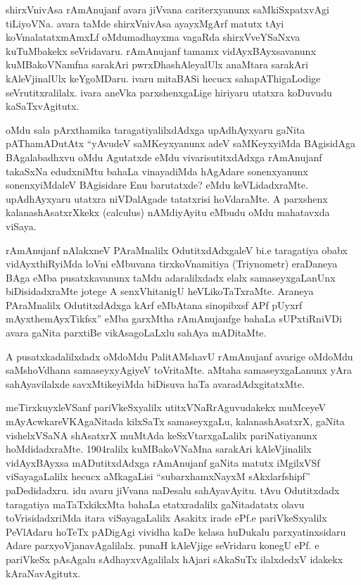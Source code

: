 shirxVnivAsa rAmAnujanf avara jiVvana cariterxyanunx saMkiSxpatxvAgi tiLiyoVNa. avara taMde shirxVnivAsa ayayxMgArf matutx tAyi koVmalatatxmAmxLf oMdu\break madhayxma vagaRda shirxVveYSaNxva kuTuMbakekx seVridavaru. rAmAnujanf tamamx vidAyxBAyxsavanunx kuMBa\-koVNamfna sarakAri pwrxDhashAleyalUlx anaMtara sarakAri kAleVjinalUlx keYgoMDaru. ivaru mitaBASi hecucx sahapAThigaLodige seVrutitxralilalx. ivara aneVka parxshenxgaLige hiriyaru utatxra koDuvudu kaSaTxvAgitutx.

oMdu sala pArxthamika taragatiyalilxdAdxga upAdhAyxyaru gaNita pATha\-mADutAtx ``yAvudeV saMKeyxyanunx adeV saMKeyxyiMda BAgisidAga BAgalabadhxvu oMdu Agutatxde eMdu vivarisutitxdAdxga rAmAnujanf takaSxNa edudxniMtu bahaLa vinayadiMda hAgA\-dare sonenxyanunx sonenxyiMdaleV BAgisidare Enu barutatxde? eMdu keVLidadxraMte. upAdhAyxyaru utatxra niVDalAgade tatatxrisi hoVdaraMte. A parxshenx kalanashAsatxrXkekx {\rm (calculus)} nAMdiyAyitu eMbudu oMdu mahatavxda viSaya. 

rAmAnujanf nAlakxneV PAraMnalilx OdutitxdAdxgaleV bi.e taragatiya obabx vidAyxthiR\-yiMda loVni eMbuvana tirxkoVnamitiya {\rm (Triynometr)} eraDaneya BAga eMba pusatxkavanunx taMdu adaralilxdadx elalx samaseyxgaLanUnx biDisidadxraMte jotege A senxVhita\-nigU heVLikoTaTxraMte. Araneya PAraMnalilx OdutitxdAdxga kArf eMbAtana sinopibxsf APf pUyxrf mAyxthemAyxTikfsx'' eMba garxMtha rAmAnujanfge bahaLa sUPxtiRniVDi avara gaNita parxtiBe vikAsagoLaLxlu sahAya mADitaMte.

A pusatxkadalilxdadx oMdoMdu PalitAMshavU rAmAnujanf avarige oMdoMdu saMshoVdhana samaseyxyAgiyeV toVritaMte. aMtaha samaseyxgaLanunx yAra sahAya\-vilalxde savxMtikeyiMda biDisuva haTa avaradAdxgitatxMte.

meTirxkuyxleVSanf pariVkeSxyalilx utitxVNaRrAguvudakekx muMceyeV mAyAcwka\break reVKAgaNitada kilxSaTx samaseyxgaLu, kalanashAsatxrX, gaNita vishelxVSaNA shAsatxrX muMtAda keSxVtarxgaLalilx pariNatiyanunx hoMdidadxraMte. {\rm 1904}ralilx kuMBakoVNaMna sarakAri kAleVjinalilx vidAyxBAyxsa mADutitxdAdxga rAmAnujanf gaNita matutx iMgilxVSf viSayagaLalilx hecucx aMkagaLisi ``subarxhamxNayxM sAkxlarfshipf'' paDedidadxru. idu avaru jiVvana naDesalu sahAyavAyitu. tAvu Odutitxdadx taragatiya maTaTxkikxMta bahaLa etatxradalilx gaNita\-datatx olavu toVrisidadxriMda itara viSayagaLalilx Asakitx irade ePf.e pariVkeSxyalilx PeVlAdaru hoTeTx pADigAgi vividha kaDe kelasa huDukalu parxyatinxsidaru Adare parxyoV\-janavAgalilalx. punaH kAleVjige seVridaru konegU ePf. e pariVkeSx pAsAgalu sAdhayxvAgalilalx hAjari sAkaSuTx ilalxdedxV idakekx kAraNavAgitutx.

